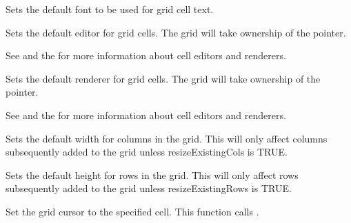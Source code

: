 Sets the default font to be used for grid cell text.

\label{wxgridsetdefaulteditor}


Sets the default editor for grid cells. The grid will take ownership of the pointer.

See  and
the  for more information about cell editors and renderers.

\label{wxgridsetdefaultrenderer}


Sets the default renderer for grid cells. The grid will take ownership of the pointer.

See  and
the  for more information about cell editors and renderers.

\label{wxgridsetdefaultcolsize}


Sets the default width for columns in the grid. This will only affect columns subsequently added to
the grid unless resizeExistingCols is TRUE. 

\label{wxgridsetdefaultrowsize}


Sets the default height for rows in the grid. This will only affect rows subsequently added
to the grid unless resizeExistingRows is TRUE.

\label{wxgridsetgridcursor}


Set the grid cursor to the specified cell. 
This function calls .

\label{wxgridsetgridlinecolour}


